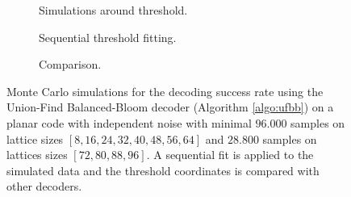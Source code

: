 \begin{figure}[htbp]
  \centering
  \begin{subfigure}[b]{0.49\textwidth}
    \begin{adjustbox}{Clip=0 1em 0 0}
      
    \end{adjustbox}
    \caption{Simulations around threshold.}
  \end{subfigure}
  \begin{subfigure}[b]{0.49\textwidth}
    \begin{adjustbox}{Clip=0 1em 0 0}
      
    \end{adjustbox}
    \caption{Sequential threshold fitting.}
  \end{subfigure}
  \begin{subfigure}[b]{\textwidth}
    \begin{adjustbox}{Clip=0 1em 0 0}
    
    \end{adjustbox}
    \caption{Comparison.}
  \end{subfigure}
  \caption{Monte Carlo simulations for the decoding success rate using the Union-Find Balanced-Bloom decoder (Algorithm \ref{algo:ufbb}) on a planar code with independent noise with minimal $96.000$ samples on lattice sizes $[8, 16, 24, 32, 40, 48, 56, 64]$ and $28.800$ samples on lattices sizes $[72, 80, 88, 96]$. A sequential fit is applied to the simulated data and the threshold coordinates is compared with other decoders.}
  \label{fig:thres_ufbb_planar_2d}
\end{figure}


